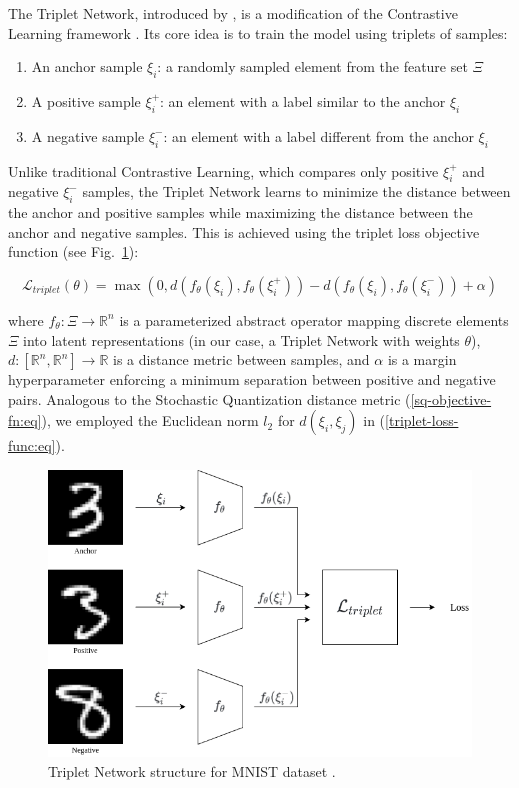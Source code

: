 The Triplet Network, introduced by \cite{Hoffer_2015}, is a modification of the Contrastive Learning framework \cite{Khosla_2020}. Its core idea is to train the model using triplets of samples:

\begin{enumerate}
    \item An anchor sample $\xi_i$: a randomly sampled element from the feature set $\Xi$
    \item A positive sample $\xi^{+}_i$: an element with a label similar to the anchor $\xi_i$
    \item A negative sample $\xi^{-}_i$: an element with a label different from the anchor $\xi_i$
\end{enumerate}

Unlike traditional Contrastive Learning, which compares only positive $\xi^{+}_i$ and negative $\xi^{-}_i$ samples, the Triplet Network learns to minimize the distance between the anchor and positive samples while maximizing the distance between the anchor and negative samples. This is achieved using the triplet loss objective function (see Fig.~\ref{triplet-network:fig}):

\begin{equation}
    \label{triplet-loss-func:eq}
    \mathcal{L}_{triplet}(\theta) = \max (0, d(f_{\theta}(\xi_i), f_{\theta}(\xi^{+}_i)) - d(f_{\theta}(\xi_i), f_{\theta}(\xi^{-}_i)) + \alpha)
\end{equation}

\noindent where $f_{\theta}: \Xi \to \mathbb{R}^n$ is a parameterized abstract operator mapping discrete elements $\Xi$ into latent representations (in our case, a Triplet Network with weights $\theta$), $d: [\mathbb{R}^n, \mathbb{R}^n] \to \mathbb{R}$ is a distance metric between samples, and $\alpha$ is a margin hyperparameter enforcing a minimum separation between positive and negative pairs. Analogous to the Stochastic Quantization distance metric (\ref{sq-objective-fn:eq}), we employed the Euclidean norm $l_2$ for $d(\xi_i, \xi_j)$ in (\ref{triplet-loss-func:eq}).

\begin{figure}
    \centering
    \includegraphics[width=\textwidth]{figures/triplet_loss.png}
    \caption{Triplet Network structure for MNIST dataset \cite{lecun2010mnist}.} \label{triplet-network:fig}
\end{figure}

